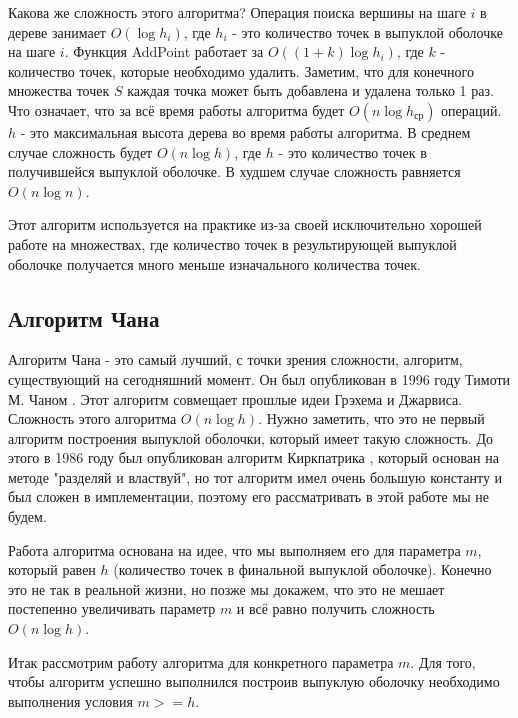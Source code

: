 Какова же сложность этого алгоритма? Операция поиска вершины на шаге $i$ в дереве занимает $O(\log h_i)$, где $h_i$ - это количество точек в выпуклой оболочке на шаге $i$. Функция AddPoint работает за $O((1+k) \log h_i)$, где $k$ - количество точек, которые необходимо удалить. Заметим, что для конечного множества точек $S$ каждая точка может быть добавлена и удалена только 1 раз. Что означает, что за всё время работы алгоритма будет $O(n \log h_{ср})$ операций. $h$ - это максимальная высота дерева во время работы алгоритма. В среднем случае сложность будет $O(n \log h)$, где $h$ - это количество точек в получившейся выпуклой оболочке. В худшем случае сложность равняется $O(n \log n)$.

Этот алгоритм используется на практике из-за своей исключительно хорошей работе на множествах, где количество точек в результирующей выпуклой оболочке получается много меньше изначального количества точек.

\subsection{Алгоритм Чана} \label{subsect1_1_6}


Алгоритм Чана - это самый лучший, с точки зрения сложности, алгоритм, существующий на сегодняшний момент. Он был опубликован в 1996 году Тимоти М. Чаном \cite{chan1996Chan}. Этот алгоритм совмещает прошлые идеи Грэхема и Джарвиса. Сложность этого алгоритма $O(n \log h)$. Нужно заметить, что это не первый алгоритм построения выпуклой оболочки, который имеет такую сложность. До этого в 1986 году был опубликован алгоритм Киркпатрика \cite{kirkpatrick1986ultimate}, который основан на методе "разделяй и властвуй", но тот алгоритм имел очень большую константу и был сложен в имплементации, поэтому его рассматривать в этой работе мы не будем.

Работа алгоритма основана на идее, что мы выполняем его для параметра $m$, который равен $h$ (количество точек в финальной выпуклой оболочке). Конечно это не так в реальной жизни, но позже мы докажем, что это не мешает постепенно увеличивать параметр $m$ и всё равно получить сложность $O(n \log h)$.

Итак рассмотрим работу алгоритма для конкретного параметра $m$. Для того, чтобы алгоритм успешно выполнился построив выпуклую оболочку необходимо выполнения условия $m >= h$.

